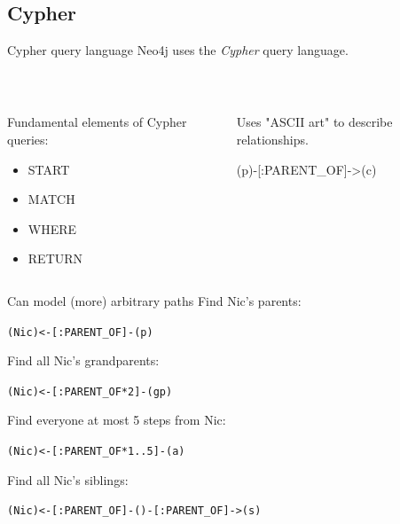 \documentclass{beamer}
\newcommand{\linespace}{\vskip 0.25cm}
\begin{document}
\subsection{Cypher}

\begin{frame}{Cypher query language}
			Neo4j uses the \emph{Cypher} query language.
			
			\linespace
			
			~\\
			
			\linespace

	\begin{columns}
		\begin{column}[T]{0.5\textwidth}
			
			Fundamental elements of Cypher queries:
		\begin{itemize}
			\item START
			\item MATCH
			\item WHERE
			\item RETURN
		\end{itemize}
		
	\end{column}
	\begin{column}[T]{0.5\textwidth}
		Uses "ASCII art" to describe relationships.
	
	\linespace

(p)-[:PARENT\_OF]->(c)

	\end{column}	
	\end{columns}
\end{frame}

\begin{frame}{Can model (more) arbitrary paths}
	Find Nic's parents:
	
	\begin{center}
		\texttt{(Nic)<-[:PARENT\_OF]-(p)}
	\end{center}

	Find all Nic's grandparents:
	
	\begin{center}
		\texttt{(Nic)<-[:PARENT\_OF*2]-(gp)}
	\end{center}
	
		Find everyone at most 5 steps from Nic:
		
		\begin{center}
			\texttt{(Nic)<-[:PARENT\_OF*1..5]-(a)}
		\end{center}
		
	Find all Nic's siblings:
	
	\begin{center}
		\texttt{(Nic)<-[:PARENT\_OF]-()-[:PARENT\_OF]->(s)}
	\end{center}
	
\end{frame}
\end{document}
